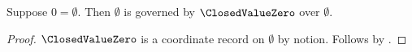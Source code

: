 \begin{proposition}\label{closed_value_imported_equality}
    Suppose $0=\emptyset$.
    Then $\emptyset$ is governed by $\ClosedValueZero$ over $\emptyset$.
\end{proposition}
\begin{proof}
    $\ClosedValueZero$ is a coordinate record on $\emptyset$ by notion.
    Follows by .
\end{proof}
